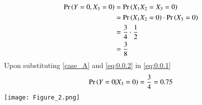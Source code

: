 \documentclass[journal,12pt,twocolumn]{IEEEtran}
\begin{document}
\begin{align}
    \Pr\left(Y=0,X_3=0\right) &= \Pr\left(X_1X_2=X_3=0\right)\\
    &= \Pr\left(X_1X_2=0\right)\cdot\Pr\left(X_3=0\right)\\
    &=\frac{3}{4} \cdot \frac{1}{2}\\
    &=\frac{3}{8} \label{case_A}
\end{align}
Upon substituting \eqref{case_A} and \eqref{eq:0.0.2} in \eqref{eq:0.0.1}
\begin{align}
    \Pr\left(Y=0|X_3=0\right) = \dfrac{3}{4} = 0.75
\end{align}
\texttt{[image: Figure\_2.png]}
\end{document}
